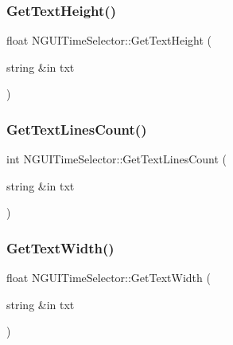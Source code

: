\hypertarget{class_n_g_u_i_time_selector_a67814a44884039638ae34d1814664247}{}\label{class_n_g_u_i_time_selector_a67814a44884039638ae34d1814664247} 
\subsubsection{\texorpdfstring{Get\+Text\+Height()}{GetTextHeight()}}
{\footnotesize\ttfamily float N\+G\+U\+I\+Time\+Selector\+::\+Get\+Text\+Height (\begin{DoxyParamCaption}\item[{string \&in}]{txt }\end{DoxyParamCaption})}

\hypertarget{class_n_g_u_i_time_selector_aecf7da8c8bfef9436f04f4f295a356bf}{}\label{class_n_g_u_i_time_selector_aecf7da8c8bfef9436f04f4f295a356bf} 
\subsubsection{\texorpdfstring{Get\+Text\+Lines\+Count()}{GetTextLinesCount()}}
{\footnotesize\ttfamily int N\+G\+U\+I\+Time\+Selector\+::\+Get\+Text\+Lines\+Count (\begin{DoxyParamCaption}\item[{string \&in}]{txt }\end{DoxyParamCaption})}

\hypertarget{class_n_g_u_i_time_selector_a75feffa5cc02dd6022ee06b41c9bd66a}{}\label{class_n_g_u_i_time_selector_a75feffa5cc02dd6022ee06b41c9bd66a} 
\subsubsection{\texorpdfstring{Get\+Text\+Width()}{GetTextWidth()}}
{\footnotesize\ttfamily float N\+G\+U\+I\+Time\+Selector\+::\+Get\+Text\+Width (\begin{DoxyParamCaption}\item[{string \&in}]{txt }\end{DoxyParamCaption})}

